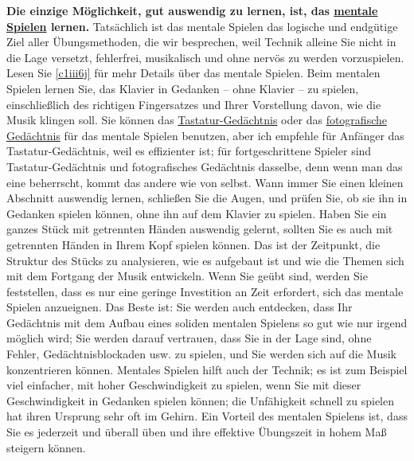 \textbf{Die einzige Möglichkeit, gut auswendig zu lernen, ist, das \hyperref[c1iii6tastatur]{mentale Spielen} lernen.}
Tatsächlich ist das mentale Spielen das logische und endgütige Ziel aller Übungsmethoden, die wir besprechen, weil Technik alleine Sie nicht in die Lage versetzt, fehlerfrei, musikalisch und ohne nervös zu werden vorzuspielen.
Lesen Sie \hyperref[c1iii6j]{\autoref{c1iii6j}} für mehr Details über das mentale Spielen.
Beim mentalen Spielen lernen Sie, das Klavier in Gedanken -- ohne Klavier -- zu spielen, einschließlich des richtigen Fingersatzes und Ihrer Vorstellung davon, wie die Musik klingen soll.
Sie können das \hyperref[c1iii6tastatur]{Tastatur-Gedächtnis} oder das \hyperref[c1iii6foto]{fotografische Gedächtnis} für das mentale Spielen benutzen, aber ich empfehle für Anfänger das Tastatur-Gedächtnis, weil es effizienter ist;
für fortgeschrittene Spieler sind Tastatur-Gedächtnis und  fotografisches Gedächtnis dasselbe, denn wenn man das eine beherrscht, kommt das andere wie von selbst.
Wann immer Sie einen kleinen Abschnitt auswendig lernen, schließen Sie die Augen, und prüfen Sie, ob sie ihn in Gedanken spielen können, ohne ihn auf dem Klavier zu spielen.
Haben Sie ein ganzes Stück mit getrennten Händen auswendig gelernt, sollten Sie es auch mit getrennten Händen in Ihrem Kopf spielen können.
Das ist der Zeitpunkt, die Struktur des Stücks zu analysieren, wie es aufgebaut ist und wie die Themen sich mit dem Fortgang der Musik entwickeln.
Wenn Sie geübt sind, werden Sie feststellen, dass es nur eine geringe Investition an Zeit erfordert, sich das mentale Spielen anzueignen.
Das Beste ist: Sie werden auch entdecken, dass Ihr Gedächtnis mit dem Aufbau eines soliden mentalen Spielens so gut wie nur irgend möglich wird; Sie werden darauf vertrauen, dass Sie in der Lage sind, ohne Fehler, Gedächtnisblockaden usw. zu spielen, und Sie werden sich auf die Musik konzentrieren können.
Mentales Spielen hilft auch der Technik; es ist zum Beispiel viel einfacher, mit hoher Geschwindigkeit zu spielen, wenn Sie mit dieser Geschwindigkeit in Gedanken spielen können; die Unfähigkeit schnell zu spielen hat ihren Ursprung sehr oft im Gehirn.
Ein Vorteil des mentalen Spielens ist, dass Sie es jederzeit und überall üben und ihre effektive Übungszeit in hohem Maß steigern können.

